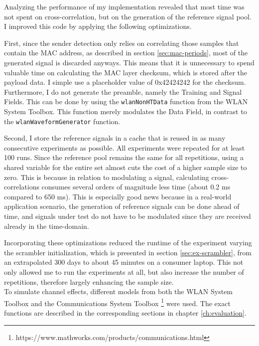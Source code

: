 Analyzing the performance of my implementation revealed that most time was not spent on cross-correlation, but on the generation of the reference signal pool. I improved this code by applying the following optimizations.

First, since the sender detection only relies on correlating those samples that contain the \gls{MAC} address, as described in section \ref{sec:mac-periods}, most of the generated signal is discarded anyways. This means that it is unnecessary to spend valuable time on calculating the \gls{MAC} layer checksum, which is stored after the payload data. I simple use a placeholder value of 0x42424242 for the checksum. Furthermore, I do not generate the preamble, namely the Training and Signal Fields. This can be done by using the \texttt{wlanNonHTData} function from the WLAN System Toolbox. This function merely modulates the Data Field, in contrast to the \texttt{wlanWaveformGenerator} function.

Second, I store the reference signals in a cache that is reused in as many consecutive experiments as possible. All experiments were repeated for at least 100 runs. Since the reference pool remains the same for all repetitions, using a shared variable for the entire set almost cuts the cost of a higher sample size to zero. This is because in relation to modulating a signal, calculating cross-correlations consumes several orders of magnitude less time (about 0.2 ms compared to 650 ms). This is especially good news because in a real-world application scenario, the generation of reference signals can be done ahead of time, and signals under test do not have to be modulated since they are received already in the time-domain.

Incorporating these optimizations reduced the runtime of the experiment varying the scrambler initialization, which is presented in section \ref{sec:ex-scrambler}, from an extrapolated 300 days to about 45 minutes on a consumer laptop. This not only allowed me to run the experiments at all, but also increase the number of repetitions, therefore largely enhancing the sample size.\\

To simulate channel effects, different models from both the WLAN System Toolbox and the Communications System Toolbox \footnote{https://www.mathworks.com/products/communications.html} were used. The exact functions are described in the corresponding sections in chapter \ref{ch:evaluation}.\\

